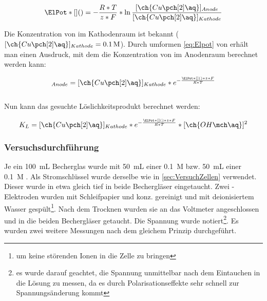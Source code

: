 \documentclass{article}
\begin{document}
      \begin{equation}
        \ElPot*[](){} = - \frac{R * T}{z * F} * \ln \frac{[\ch{Cu\pch[2]\aq}]_{Anode}}{[\ch{Cu\pch[2]\aq}]_{Kathode}} \label{eq:Elpot}
      \end{equation}
      
      Die Konzentration von  im Kathodenraum ist bekannt ($[\ch{Cu\pch[2]\aq}]_{Kathode} = \SI[mode=text]{0.1}{M}$). Durch umformen \ref{eq:Elpot} von erhält man einen Ausdruck, mit dem die Konzentration von  im Anodenraum berechnet werden kann:
      
      \begin{equation}
        [\ch{Cu\pch[2]\aq}]_{Anode} = [\ch{Cu\pch[2]\aq}]_{Kathode} * e^{- \frac{\ElPot*[](){} * z * F}{R * T}} 
      \end{equation} \\
      
      Nun kann das gesuchte Löslichkeitsprodukt berechnet werden:
      
      \begin{equation}
        K_{L} = [\ch{Cu\pch[2]\aq}]_{Kathode} * e^{- \frac{\ElPot*[](){} * z * F}{R * T}} * [\ch{OH\mch\aq}]^2 \label{eq:Loslichkeitsproduktfinale}
      \end{equation}
      
      \subsubsection{Versuchsdurchführung} \label{sec:VersuchsdurchfuhrungLoslichkeit}
      
      Je ein \SI[mode=text]{100}{\milli\liter} Becherglas wurde mit \SI[mode=text]{50}{\milli\liter} einer \SI[mode=text]{0.1}{M}  bzw. \SI[mode=text]{50}{\milli\liter} einer \SI[mode=text]{0.1}{M} . Als Stromschlüssel wurde derselbe wie in \ref{sec:VersuchZellen} verwendet. Dieser wurde in etwa gleich tief in beide Bechergläser eingetaucht. Zwei -Elektroden wurden mit Schleifpapier und konz.  gereinigt und mit deionisiertem Wasser gespült\footnote{um keine störenden Ionen in die Zelle zu bringen}. Nach dem Trocknen wurden sie an das Voltmeter angeschlossen und in die beiden Bechergläser getaucht. Die Spannung wurde notiert\footnote{es wurde darauf geachtet, die Spannung unmittelbar nach dem Eintauchen in die Lösung zu messen, da es durch Polarisationseffekte sehr schnell zur Spannungsänderung kommt}. Es wurden zwei weitere Messungen nach dem gleichem Prinzip durchgeführt.
      
\end{document}
